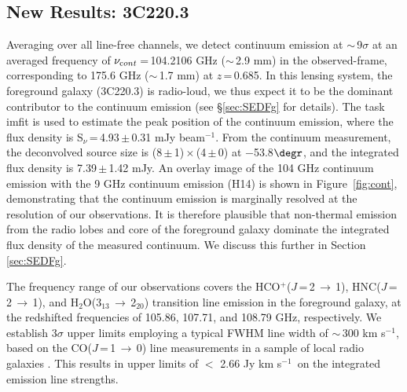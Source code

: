 \documentclass[twocolumn,apj,numberedappendix]{emulateapj}
\newcommand{\rarr}{$\rightarrow$}
\newcommand{\pmOne}{\mbox{$^{-1}$}}
\begin{document}
\subsection{New Results: 3C220.3}
Averaging over all line-free channels, we detect continuum emission at $\sim$\,9$\sigma$ at an averaged frequency of $\nu_{\textrm cont}$\,=\,104.2106 GHz ($\sim$\,2.9 mm) in the observed-frame, corresponding to 175.6 GHz ($\sim$\,1.7 mm) at $z$\,=\,0.685. In this lensing system, the
foreground galaxy (3C220.3) is radio-loud, we thus expect it to be the dominant contributor to the continuum emission (see \S \ref{sec:SEDFg} for details). The task {\sc imfit} is used to estimate the peak position of the continuum emission, where the flux density is S$_\nu$\,=\,4.93\,$\pm$\,0.31\,\,mJy\,\,beam\pmOne. From the continuum measurement, the deconvolved source size
is (8\,$\pm$\,1)\,$\times$\,(4\,$\pm$\,0) at $-$53.8$\degr$, and the integrated flux density is 7.39\,$\pm$\,1.42\,\,mJy. An overlay image of the 104 GHz
continuum emission with the 9 GHz continuum emission (H14) is shown in Figure~\ref{fig:cont}, demonstrating that the continuum
emission is marginally resolved at the resolution of our observations. It is therefore plausible that non-thermal emission from the radio lobes and core of the foreground galaxy dominate the integrated flux
density of the measured continuum. We discuss this further in Section \ref{sec:SEDFg}. \par
The frequency range of our observations covers the HCO$^+$($J$\,=\,2\,\rarr\,1), HNC($J$\,=\,2\,$\rightarrow$\,1), and H$_2$O(3$_{13}$\,\rarr\,2$_{20}$)
transition line emission in the foreground galaxy, at
the redshifted frequencies of 105.86, 107.71, and 108.79\,\,GHz, respectively. We establish 3$\sigma$ upper limits employing a typical FWHM line width of
$\sim$\,300\,\,km\,\,s\pmOne, based on the CO($J$\,=\,1\,$\rightarrow$\,0) line measurements in a sample of local radio galaxies \citep[$z$ $<$ 0.1; ][]{Smolcic11a}. This results in upper limits of $<$ 2.66\,\,Jy\,\,km\,\,s\pmOne\ on the integrated emission line strengths.
\end{document}
